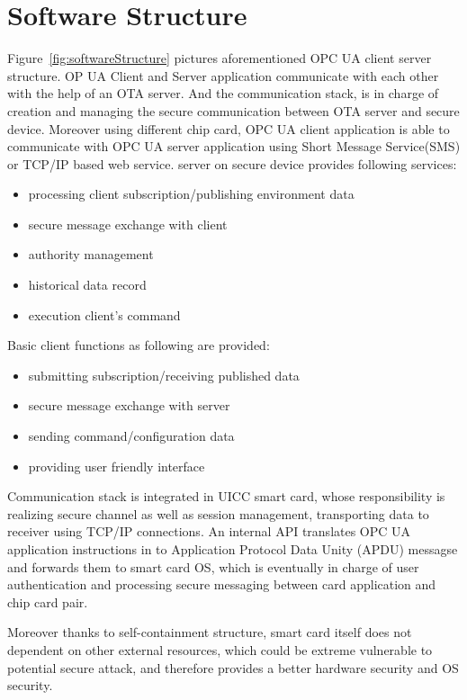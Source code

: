 \section {Software Structure}
Figure~\ref{fig:softwareStructure} pictures aforementioned OPC UA client server structure. OP UA Client and Server application communicate with each other with the help of an OTA server. And the communication stack,  is in charge of creation and managing the secure communication between OTA server and secure device. Moreover using different chip card, OPC UA client application is able to communicate with OPC UA server application using Short Message Service(SMS) or TCP/IP based web service. 
\newline
server on secure device provides following services:
 \begin{itemize}
  \item processing client subscription/publishing environment data
  \item secure message exchange with client
  \item authority management
  \item historical data record
  \item execution client's command
\end{itemize}
Basic client functions as following are provided:
 \begin{itemize}
  \item submitting subscription/receiving published data
  \item secure message exchange with server
  \item sending command/configuration data
  \item providing user friendly interface
\end{itemize}

Communication stack is integrated in UICC smart card, whose responsibility is realizing secure channel as well as session management, transporting data to receiver using TCP/IP connections. An internal API translates OPC UA application instructions in to Application Protocol Data Unity (APDU) messagse and forwards them to smart card OS, which is eventually in charge of user authentication and processing secure messaging between card application and chip card pair. 

Moreover thanks to self-containment structure, smart card itself does not dependent on other external resources, which could be extreme vulnerable to potential secure attack, and therefore provides a better hardware security and OS security.

